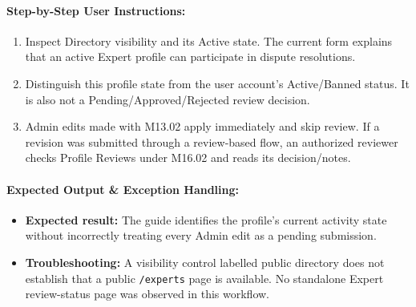 \paragraph{Step-by-Step User Instructions:}
\begin{enumerate}[leftmargin=1.8em,itemsep=3pt]
  \item Inspect Directory visibility and its Active state. The current form explains that an active Expert profile can participate in dispute resolutions.
  \item Distinguish this profile state from the user account's Active/Banned status. It is also not a Pending/Approved/Rejected review decision.
  \item Admin edits made with M13.02 apply immediately and skip review. If a revision was submitted through a review-based flow, an authorized reviewer checks Profile Reviews under M16.02 and reads its decision/notes.
\end{enumerate}
\paragraph{Expected Output \& Exception Handling:}
\begin{itemize}[leftmargin=1.5em,itemsep=2pt]
  \item \textbf{Expected result:} The guide identifies the profile's current activity state without incorrectly treating every Admin edit as a pending submission.
  \item \textbf{Troubleshooting:} A visibility control labelled public directory does not establish that a public \texttt{/experts} page is available. No standalone Expert review-status page was observed in this workflow.
\end{itemize}
